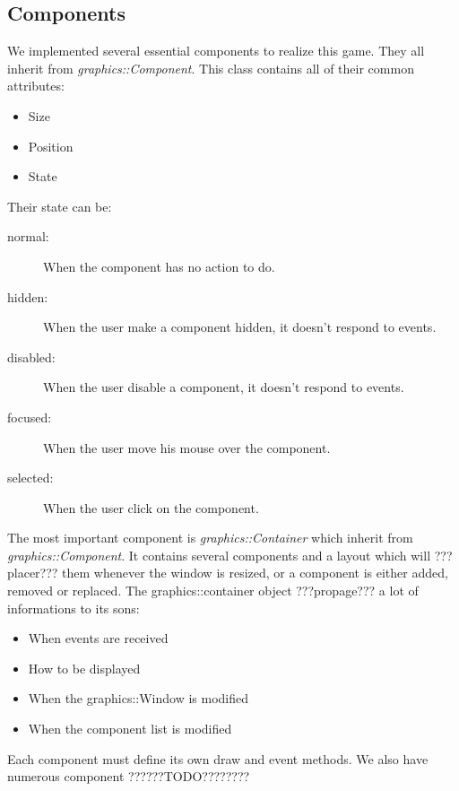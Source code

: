 \documentclass{scrreprt}
\begin{document}
					  \subsection{Components}
					  We implemented several essential components to realize this game. They all inherit from \emph{graphics::Component}. This class contains all of their common attributes:
						  \begin{itemize}
						  \item{Size}
						  \item{Position}
						  \item{State}
						  \end{itemize}

						  Their state can be:
						  \begin{description}
						  \item[normal:]{When the component has no action to do.}
						  \item[hidden:]{When the user make a component hidden, it doesn't respond to events.}
						  \item[disabled:]{When the user disable a component, it doesn't respond to events.}
						  \item[focused:]{When the user move his mouse over the component.}
						  \item[selected:]{When the user click on the component.}
						  \end{description}

						  The most important component is \emph{graphics::Container} which inherit from \emph{graphics::Component}. It contains several components and a layout which will ???placer??? them whenever the window is resized, or a component is either added, removed or replaced. The graphics::container object ???propage??? a lot of informations to its sons:
						  \begin{itemize}
						  \item{When events are received}
						  \item{How to be displayed}
						  \item{When the graphics::Window is modified}
						  \item{When the component list is modified}
						  \end{itemize}

						  Each component must define its own draw and event methods.
						  We also have numerous component ??????TODO????????
\end{document}

